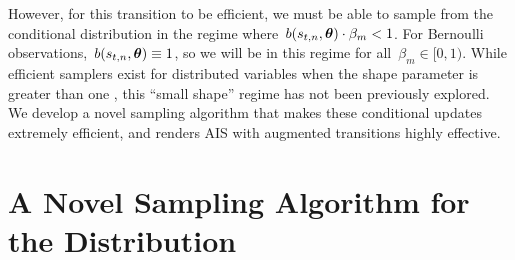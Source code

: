 However, for this transition to be efficient, we must be able to
sample from the \polyagamma conditional distribution in the regime
where~${b(s_{t,n}, \boldsymbol{\theta}) \cdot \beta_m < 1}$.  For Bernoulli
observations,~${b(s_{t,n}, \boldsymbol{\theta}) \equiv 1}$, so we will be in this
regime for all~$\beta_m \in [0,1)$.  While efficient samplers exist
for \polyagamma distributed variables when the shape parameter is
greater than one \citep{windle2014sampling}, this ``small shape''
regime has not been previously explored.  We develop a novel sampling
algorithm that makes these conditional updates extremely efficient,
and renders AIS with \polyagamma augmented transitions highly
effective.

\section{A Novel Sampling Algorithm for the \polyagamma Distribution}
\label{sec:pgsampling}

